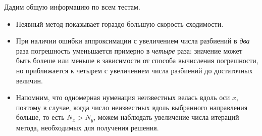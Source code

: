 \newpage
Дадим общую информацию по всем тестам.
\begin{itemize}
	\item Неявный метод показывает гораздо большую скорость
	сходимости.
	\item При наличии ошибки аппроксимации с увеличением числа
	разбиений в \textit{два} раза погрешность уменьшается примерно в
	\textit{четыре} раза: значение может быть болеше или меньше в зависимости от
	способа вычисления погрешности, но приближается к четырем с
	увеличением числа разбиений до достаточных величин.
	\item Напомним, что одномерная нуменация неизвестных велась
	вдоль оси $x$, поэтому в случае, когда число неизвестных
	вдоль выбранного направления больше, то есть $N_x > N_y$,
	можем наблюдать увеличение числа итераций метода, необходимых
	для получения решения.
\end{itemize}
